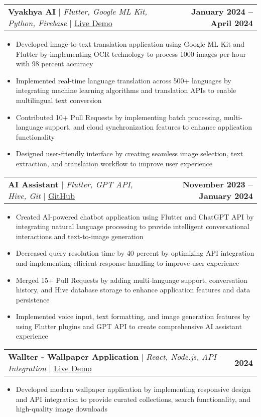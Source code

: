 \documentclass[a4paper,11pt]{article}
\makeatletter
\newcommand{\resumeItem}[1]{
  \item\small{
    {#1 \vspace{-2pt}}
  }
}
\newcommand{\resumeProjectHeading}[2]{
    \item
    \begin{tabular*}{1.001\textwidth}{l@{\extracolsep{\fill}}r}
      \small#1 & \textbf{\small #2}\\
    \end{tabular*}\vspace{-7pt}
}
\newcommand{\resumeItemListStart}{\begin{itemize}}
\newcommand{\resumeItemListEnd}{\end{itemize}\vspace{-5pt}}
\makeatother
\begin{document}
      \resumeProjectHeading
          {\textbf{Vyakhya AI} $|$ \emph{Flutter, Google ML Kit, Python, Firebase} $|$ \href{https://suraj-yadav0.github.io/vyakhya_ai-main/}{Live Demo}}{January 2024 -- April 2024}
          \resumeItemListStart
            \resumeItem{Developed image-to-text translation application using Google ML Kit and Flutter by implementing OCR technology to process 1000 images per hour with 98 percent accuracy}
            \resumeItem{Implemented real-time language translation across 500+ languages by integrating machine learning algorithms and translation APIs to enable multilingual text conversion}
            \resumeItem{Contributed 10+ Pull Requests by implementing batch processing, multi-language support, and cloud synchronization features to enhance application functionality}
            \resumeItem{Designed user-friendly interface by creating seamless image selection, text extraction, and translation workflow to improve user experience}
          \resumeItemListEnd 
          \vspace{-13pt}
          
      \resumeProjectHeading
          {\textbf{AI Assistant} $|$ \emph{Flutter, GPT API, Hive, Git} $|$ \href{https://github.com/suraj-yadav0/ai_assistent}{GitHub}}{November 2023 -- January 2024}
          \resumeItemListStart
            \resumeItem{Created AI-powered chatbot application using Flutter and ChatGPT API by integrating natural language processing to provide intelligent conversational interactions and text-to-image generation}
            \resumeItem{Decreased query resolution time by 40 percent by optimizing API integration and implementing efficient response handling to improve user experience}
            \resumeItem{Merged 15+ Pull Requests by adding multi-language support, conversation history, and Hive database storage to enhance application features and data persistence}
            \resumeItem{Implemented voice input, text formatting, and image generation features by using Flutter plugins and GPT API to create comprehensive AI assistant experience}
          \resumeItemListEnd 
          \vspace{-13pt}
          
      \resumeProjectHeading
          {\textbf{Wallter - Wallpaper Application} $|$ \emph{React, Node.js, API Integration} $|$ \href{https://wallter.vercel.app/}{Live Demo}}{2024}
          \resumeItemListStart
            \resumeItem{Developed modern wallpaper application by implementing responsive design and API integration to provide curated collections, search functionality, and high-quality image downloads}
          \resumeItemListEnd 
          \vspace{-13pt}
          
\end{document}
